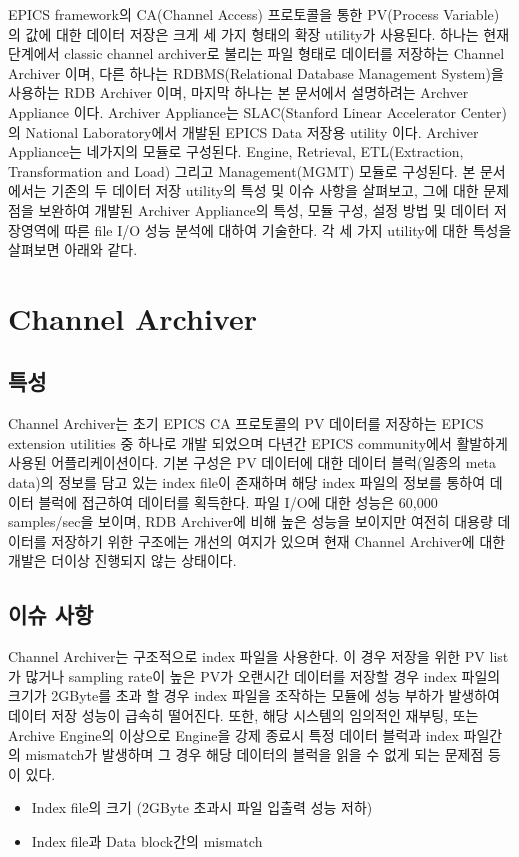 \documentclass[11pt
  , a4paper
  , article
  , oneside
]{memoir}
\begin{document}
EPICS framework\cite{epics}의 CA(Channel Access) 프로토콜을 통한 PV(Process Variable)의 값에 대한 데이터 저장은 크게 세 가지 형태의 확장 utility가 사용된다. 하나는 현재 단계에서 classic channel archiver로 불리는 파일 형태로 데이터를 저장하는 Channel Archiver\cite{archiver} 이며, 다른 하나는 RDBMS(Relational Database Management System)을 사용하는 RDB Archiver\cite{rdbarchiver} 이며, 마지막 하나는 본 문서에서 설명하려는 Archver Appliance 이다. Archiver Appliance\cite{appliance}는 SLAC(Stanford Linear Accelerator Center)의 National Laboratory에서 개발된 EPICS Data 저장용 utility 이다. Archiver Appliance\cite{appliance}는 네가지의 모듈로 구성된다. Engine, Retrieval, ETL(Extraction, Transformation and Load) 그리고 Management(MGMT) 모듈로 구성된다. 본 문서에서는 기존의 두 데이터 저장 utility의 특성 및 이슈 사항을 살펴보고, 그에 대한 문제점을 보완하여 개발된 Archiver Appliance의 특성, 모듈 구성, 설정 방법 및 데이터 저장영역에 따른 file I/O 성능 분석에 대하여 기술한다. 각 세 가지 utility에 대한 특성을 살펴보면 아래와 같다.


\hfil\break
\chapter{Channel Archiver}
\section{특성}
Channel Archiver\cite{archiver}는 초기 EPICS CA 프로토콜의 PV 데이터를 저장하는 EPICS extension utilities 중 하나로 개발 되었으며 다년간 EPICS community에서 활발하게 사용된 어플리케이션이다. 기본 구성은 PV 데이터에 대한 데이터 블럭(일종의 meta data)의 정보를 담고 있는 index file이 존재하며 해당 index 파일의 정보를 통하여 데이터 블럭에 접근하여 데이터를 획득한다. 파일 I/O에 대한 성능은 60,000 samples/sec을 보이며, RDB Archiver에 비해 높은 성능을 보이지만 여전히 대용량 데이터를 저장하기 위한 구조에는 개선의 여지가 있으며 현재 Channel Archiver에 대한 개발은 더이상 진행되지 않는 상태이다.
\section{이슈 사항}
Channel Archiver\cite{archiver}는 구조적으로 index 파일을 사용한다. 이 경우 저장을 위한 PV list가 많거나 sampling rate이 높은 PV가 오랜시간 데이터를 저장할 경우 index 파일의 크기가 2GByte를 초과 할 경우 index 파일을 조작하는 모듈에 성능 부하가 발생하여 데이터 저장 성능이 급속히 떨어진다. 또한, 해당 시스템의 임의적인 재부팅, 또는 Archive Engine의 이상으로 Engine을 강제 종료시 특정 데이터 블럭과 index 파일간의 mismatch가 발생하며 그 경우 해당 데이터의 블럭을 읽을 수 없게 되는 문제점 등이 있다.
\begin{itemize}
	\item Index file의 크기 (2GByte 초과시 파일 입출력 성능 저하)
	\item Index file과 Data block간의 mismatch
\end{itemize}
\hfil\break
\end{document}
